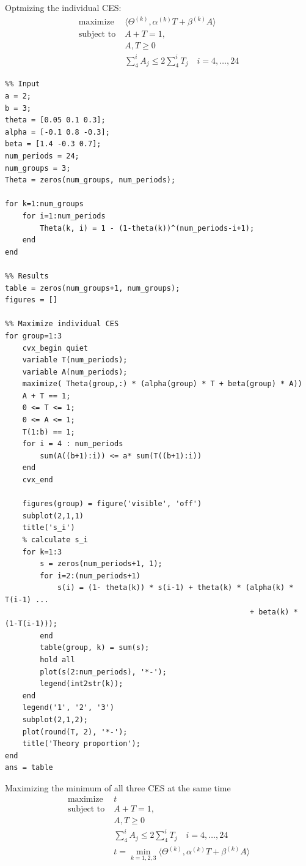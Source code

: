 \documentclass[11pt]{article}
\begin{document}
Optmizing the individual CES:
  \begin{align}
  \text{maximize} \; & \langle \Theta^{(k)}, \alpha^{(k)} T + \beta^{(k)} A \rangle \\
  \text{subject to} \; & A + T = 1,
    \\& A, T \ge 0
    \\& \sum_4^i A_j \le  2 \sum_4^i T_j \quad i = 4, \ldots, 24
\end{align}

\begin{verbatim}
%% Input
a = 2;
b = 3;
theta = [0.05 0.1 0.3];
alpha = [-0.1 0.8 -0.3];
beta = [1.4 -0.3 0.7];
num_periods = 24;
num_groups = 3;
Theta = zeros(num_groups, num_periods);

for k=1:num_groups
    for i=1:num_periods
        Theta(k, i) = 1 - (1-theta(k))^(num_periods-i+1);
    end
end

%% Results
table = zeros(num_groups+1, num_groups);
figures = []

%% Maximize individual CES
for group=1:3
    cvx_begin quiet
    variable T(num_periods);
    variable A(num_periods);
    maximize( Theta(group,:) * (alpha(group) * T + beta(group) * A))
    A + T == 1;
    0 <= T <= 1;
    0 <= A <= 1;
    T(1:b) == 1;
    for i = 4 : num_periods
        sum(A((b+1):i)) <= a* sum(T((b+1):i))
    end
    cvx_end

    figures(group) = figure('visible', 'off')
    subplot(2,1,1)
    title('s_i')
    % calculate s_i
    for k=1:3
        s = zeros(num_periods+1, 1);
        for i=2:(num_periods+1)
            s(i) = (1- theta(k)) * s(i-1) + theta(k) * (alpha(k) * T(i-1) ...
                                                        + beta(k) * (1-T(i-1)));
        end
        table(group, k) = sum(s);
        hold all
        plot(s(2:num_periods), '*-');
        legend(int2str(k));
    end
    legend('1', '2', '3')
    subplot(2,1,2);
    plot(round(T, 2), '*-');
    title('Theory proportion');
end
ans = table
\end{verbatim}





Maximizing the minimum of  all three CES at the same time
\begin{align}
  \text{maximize} \; & t \\
  \text{subject to} \; & A + T = 1,
  \\& A, T \ge 0
  \\& \sum_4^i A_j \le  2 \sum_4^i T_j \quad i = 4, \ldots, 24
  \\& t = \min_{k = 1, 2, 3} \langle \Theta^{(k)}, \alpha^{(k)} T + \beta^{(k)} A \rangle 
\end{align}
\end{document}
